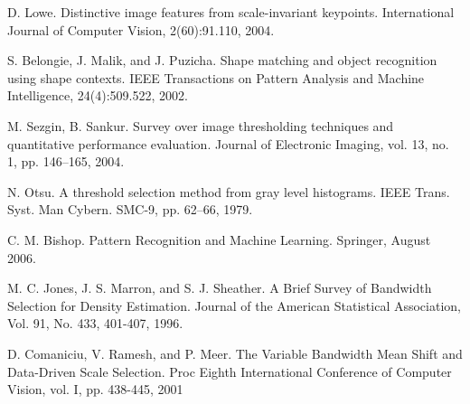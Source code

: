 \documentclass[conference]{IEEEtran}
\begin{document}
\begin{thebibliography}{19}
  D. Lowe. Distinctive image features from scale-invariant keypoints. International Journal of Computer Vision, 2(60):91.110, 2004.

  S. Belongie, J. Malik, and J. Puzicha. Shape matching and object recognition using shape contexts. IEEE Transactions on Pattern Analysis and Machine Intelligence, 24(4):509.522, 2002.

  M. Sezgin, B. Sankur. Survey over image thresholding techniques and quantitative performance evaluation. Journal of Electronic Imaging, vol. 13, no. 1, pp. 146–165, 2004.

  N. Otsu. A threshold selection method from gray level histograms. IEEE Trans. Syst. Man Cybern. SMC-9, pp. 62–66, 1979.

  C. M. Bishop. Pattern Recognition and Machine Learning. Springer, August 2006.

  M. C. Jones, J. S. Marron, and S. J. Sheather. A Brief Survey of Bandwidth Selection for Density Estimation. Journal of the American Statistical Association, Vol. 91, No. 433, 401-407, 1996.

  D. Comaniciu, V. Ramesh, and P. Meer. The Variable Bandwidth Mean Shift and Data-Driven Scale Selection. Proc Eighth International Conference of Computer Vision, vol. I, pp. 438-445, 2001

\end{thebibliography}
\end{document}
